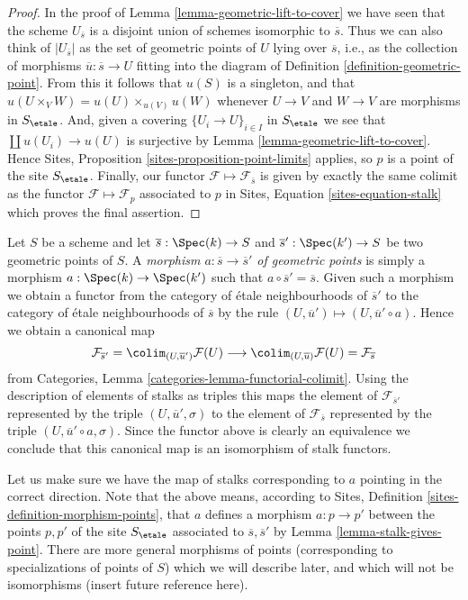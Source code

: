 \begin{proof}
In the proof of
Lemma \ref{lemma-geometric-lift-to-cover}
we have seen that the scheme $U_{\overline{s}}$ is a disjoint union of
schemes isomorphic to $\overline{s}$. Thus we can also think of
$|U_{\overline{s}}|$ as the set of geometric points of $U$ lying over
$\overline{s}$, i.e., as the collection of morphisms
$\overline{u} : \overline{s} \to U$ fitting into the diagram of
Definition \ref{definition-geometric-point}.
From this it follows that $u(S)$ is a singleton, and that
$u(U \times_V W) = u(U) \times_{u(V)} u(W)$
whenever $U \to V$ and $W \to V$ are morphisms in $S_\etale$.
And, given a covering $\{U_i \to U\}_{i \in I}$ in $S_\etale$
we see that $\coprod u(U_i) \to u(U)$ is surjective by
Lemma \ref{lemma-geometric-lift-to-cover}.
Hence
Sites, Proposition \ref{sites-proposition-point-limits}
applies, so $p$ is a point of the site $S_\etale$.
Finally, our functor $\mathcal{F} \mapsto \mathcal{F}_{\overline{s}}$
is given by exactly the same colimit as the functor
$\mathcal{F} \mapsto \mathcal{F}_p$ associated to $p$ in
Sites, Equation \ref{sites-equation-stalk}
which proves the final assertion.
\end{proof}

\begin{remark}
\label{remark-map-stalks}
Let $S$ be a scheme and let $\overline{s} : \Spec(k) \to S$
and $\overline{s}' : \Spec(k') \to S$ be two geometric points of
$S$. A {\it morphism $a : \overline{s} \to \overline{s}'$ of geometric points}
is simply a morphism $a : \Spec(k) \to \Spec(k')$ such that
$a \circ \overline{s}' = \overline{s}$. Given such a morphism we obtain
a functor from the category of \'etale neighbourhoods of $\overline{s}'$
to the category of \'etale neighbourhoods of $\overline{s}$ by the rule
$(U, \overline{u}') \mapsto (U, \overline{u}' \circ a)$. Hence we obtain
a canonical map
$$
\mathcal{F}_{\overline{s}'}
=
\colim_{(U, \overline{u}')} \mathcal{F}(U)
\longrightarrow
\colim_{(U, \overline{u})} \mathcal{F}(U)
=
\mathcal{F}_{\overline{s}}
$$
from Categories, Lemma \ref{categories-lemma-functorial-colimit}. Using the
description of elements of stalks as triples this maps the element of
$\mathcal{F}_{\overline{s}'}$ represented by the triple
$(U, \overline{u}', \sigma)$ to the element of $\mathcal{F}_{\overline{s}}$
represented by the triple $(U, \overline{u}' \circ a, \sigma)$.
Since the functor above is clearly an equivalence we conclude that this
canonical map is an isomorphism of stalk functors.

\medskip\noindent
Let us make sure we have the map of stalks corresponding to $a$ pointing
in the correct direction. Note that the above means, according to
Sites, Definition \ref{sites-definition-morphism-points},
that $a$ defines a morphism $a : p \to p'$ between the points $p, p'$ of
the site $S_\etale$ associated to $\overline{s}, \overline{s}'$ by
Lemma \ref{lemma-stalk-gives-point}. There are more general morphisms of
points (corresponding to specializations of points of $S$) which we will
describe later, and which will not be isomorphisms (insert future
reference here).
\end{remark}

